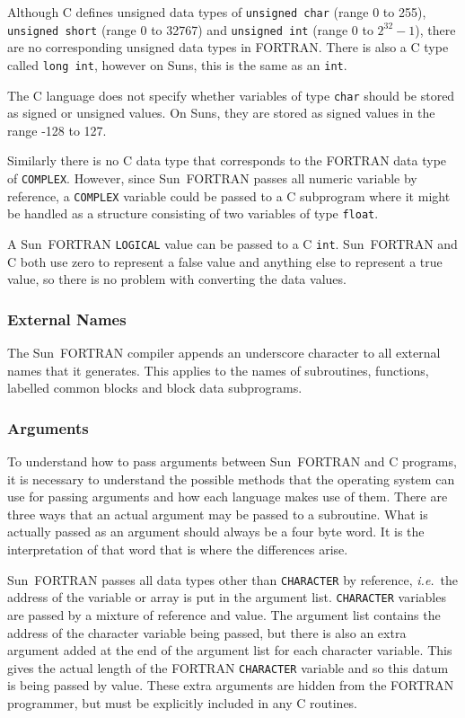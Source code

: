 \documentclass[twoside,11pt,nolof]{starlink}
\begin{document}
Although C defines unsigned data types of \texttt{unsigned char}
(range 0 to 255), \texttt{unsigned short} (range 0 to 32767) and
\texttt{unsigned int} (range 0 to $2^{32}-1$), there are no corresponding
unsigned data types in FORTRAN\@.
There is also a C type called \texttt{long int}, however on Suns, this is the
same as an \texttt{int}.

The C language does not specify whether variables of type \texttt{char} should
be stored as signed or unsigned values. On Suns, they are stored as signed
values in the range -128 to 127.

Similarly there is no C data type that corresponds to the FORTRAN data type of
\texttt{COMPLEX}\@. However, since Sun~FORTRAN passes all numeric variable by
reference, a \texttt{COMPLEX} variable could be passed to a C subprogram where
it might be handled as a structure consisting of two variables of type
\texttt{float}.

A Sun~FORTRAN \texttt{LOGICAL} value can be passed to a C \texttt{int}.
Sun~FORTRAN and C both use zero to represent a false value and anything else
to represent a true value, so there is no problem with converting the data
values.

\subsubsection{External Names}

The Sun~FORTRAN compiler appends an underscore character to all external names
that it generates.
This applies to the names of subroutines, functions, labelled common blocks
and block data subprograms.

\subsubsection{\label{sun_arg}Arguments}

To understand how to pass arguments between Sun~FORTRAN and C programs, it is
necessary to understand the possible methods that the operating system can use
for passing arguments and how each language makes use of them. There are three
ways that an actual argument may be passed to a subroutine. What is actually
passed as an argument should always be a four byte word. It is the
interpretation of that word that is where the differences arise.

Sun~FORTRAN passes all data types other than \texttt{CHARACTER} by reference,
\textit{i.e.}\ the address of the variable or array is put in the argument list.
\texttt{CHARACTER} variables are passed by  a mixture of reference and value.
The argument list contains the address of the character variable being passed,
but there is also an extra argument added at the end of the argument list for
each character variable.
This gives the actual length of the FORTRAN \texttt{CHARACTER} variable and so
this datum is being passed by value. These extra arguments are hidden from the
FORTRAN programmer, but must be explicitly included in any C routines.
\end{document}
